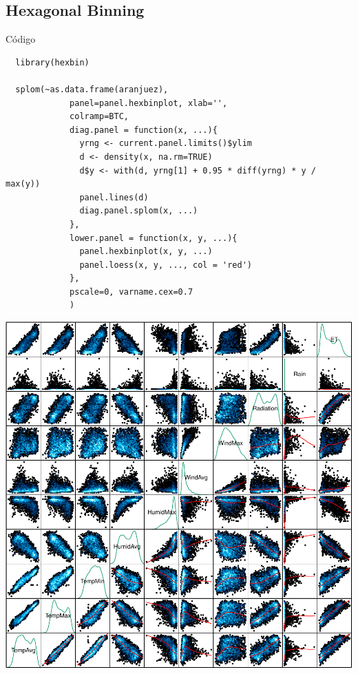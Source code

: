 \documentclass[xcolor={usenames,svgnames,dvipsnames}]{beamer}
\begin{document}
\subsection{Hexagonal Binning}
\label{sec-4-3}

\begin{frame}[fragile,label=sec-4-3-1]{Código}
 \lstset{language=R,label= ,caption= ,numbers=none}
\begin{lstlisting}
  library(hexbin)
  
  splom(~as.data.frame(aranjuez),
             panel=panel.hexbinplot, xlab='',
             colramp=BTC,
             diag.panel = function(x, ...){
               yrng <- current.panel.limits()$ylim
               d <- density(x, na.rm=TRUE)
               d$y <- with(d, yrng[1] + 0.95 * diff(yrng) * y / max(y))
               panel.lines(d)
               diag.panel.splom(x, ...)
             },
             lower.panel = function(x, y, ...){
               panel.hexbinplot(x, y, ...)
               panel.loess(x, y, ..., col = 'red')
             },
             pscale=0, varname.cex=0.7
             )
\end{lstlisting}
\end{frame}

\begin{frame}[label=sec-4-3-2]{}
\includegraphics[width=.9\linewidth]{figs/aranjuezSplomHexbin.pdf}
\end{frame}
\end{document}
